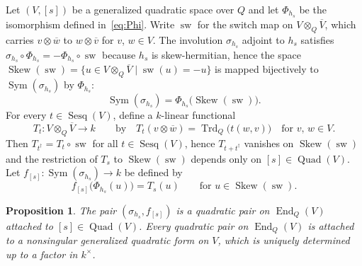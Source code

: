 \documentclass{amsart}
\newcommand{\op}{\dag}
\DeclareMathOperator{\Sesq}{Sesq}
\DeclareMathOperator{\Quad}{Quad}
\DeclareMathOperator{\sw}{sw}
\DeclareMathOperator{\End}{End}
\DeclareMathOperator{\Trd}{Trd}
\DeclareMathOperator{\Sym}{Sym}
\DeclareMathOperator{\Skew}{Skew}
\newtheorem{prop}{Proposition}[section]
\theoremstyle{remark}
\begin{document}
Let $(V,[s])$ be a generalized quadratic space over $Q$ and let $\Phi_{h_s}$ be the isomorphism defined in~\eqref{eq:Phi}. 
 Write $\sw$ for the switch map on $V\otimes_Q\overline V$, which
carries $v\otimes\overline w$ to $w\otimes\overline{v}$ for $v$, $w\in
V$. The involution $\sigma_{h_s}$ adjoint to $h_s$ satisfies
$\sigma_{h_s}\circ\Phi_{h_s} = -\Phi_{h_s}\circ\sw$ because $h_s$ is
skew-hermitian, hence the space $\Skew(\sw)=\{u\in V\otimes_Q\overline
V\mid \sw(u)=-u\}$ is mapped bijectively to $\Sym(\sigma_{h_s})$ by
$\Phi_{h_s}$:
\[
  \Sym(\sigma_{h_s}) = \Phi_{h_s}\bigl(\Skew(\sw)\bigr).
\]
For every $t\in\Sesq(V)$, define a $k$-linear functional
\[
  T_t\colon V\otimes_Q\overline V \to k
  \qquad\text{by}\quad
  T_t(v\otimes\overline w) = \Trd_Q\bigl(t(w,v)\bigr)
  \quad\text{for $v$, $w\in V$.}
\]
Then $T_{t^\op} = T_t\circ\sw$ for all $t\in\Sesq(V)$, hence
$T_{t+t^\op}$ 
vanishes on $\Skew(\sw)$ and the restriction of $T_s$ to $\Skew(\sw)$
depends only on $[s]\in\Quad(V)$. Let $f_{[s]}\colon
\Sym(\sigma_{h_s})\to k$ be defined by
\[
  f_{[s]}\bigl(\Phi_{h_s}(u)\bigr) = T_s(u) \qquad\text{for $u\in
    \Skew(\sw)$.}
\]

\begin{prop}
  \label{prop:quadpair}
  The pair $(\sigma_{h_s},f_{[s]})$ is a quadratic pair on $\End_Q(V)$
  attached to $[s]\in\Quad(V)$. Every quadratic pair on $\End_Q(V)$ is
  attached to a nonsingular generalized quadratic form on $V$, which
  is uniquely determined up to a factor in $k^\times$.
\end{prop}
\end{document}
